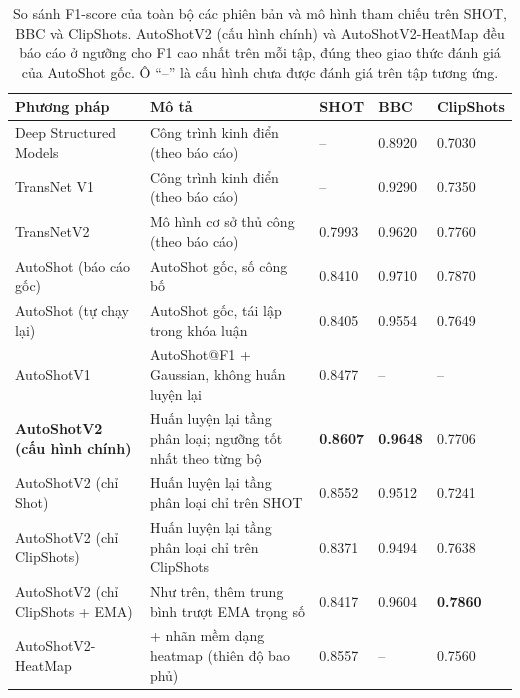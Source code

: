 \begin{table}[H]
\centering
\small
\setlength{\tabcolsep}{5pt}
\renewcommand{\arraystretch}{1.2}
\caption[So sánh F1-score các phiên bản trên SHOT, BBC và ClipShots]{So sánh F1-score của toàn bộ các phiên bản và mô hình tham chiếu trên SHOT, BBC và ClipShots. AutoShotV2 (cấu hình chính) và AutoShotV2-HeatMap đều báo cáo ở ngưỡng cho F1 cao nhất trên mỗi tập, đúng theo giao thức đánh giá của AutoShot gốc. Ô ``--'' là cấu hình chưa được đánh giá trên tập tương ứng.}
\label{tab:autoshotv2_results}
\begin{tabular}{L{4.4cm}L{4.0cm}C{1.35cm}C{1.35cm}C{1.5cm}}
\toprule
\textbf{Phương pháp} & \textbf{Mô tả} & \textbf{SHOT} & \textbf{BBC} & \textbf{ClipShots} \\
\midrule
Deep Structured Models & Công trình kinh điển (theo báo cáo) & -- & 0.8920 & 0.7030 \\
TransNet V1 & Công trình kinh điển (theo báo cáo) & -- & 0.9290 & 0.7350 \\
TransNetV2 & Mô hình cơ sở thủ công (theo báo cáo) & 0.7993 & 0.9620 & 0.7760 \\
AutoShot (báo cáo gốc) & AutoShot gốc, số công bố & 0.8410 & 0.9710 & 0.7870 \\
AutoShot (tự chạy lại) & AutoShot gốc, tái lập trong khóa luận & 0.8405 & 0.9554 & 0.7649 \\
\midrule
AutoShotV1 & AutoShot@F1 + Gaussian, không huấn luyện lại & 0.8477 & -- & -- \\
\textbf{AutoShotV2 (cấu hình chính)} & Huấn luyện lại tầng phân loại; ngưỡng tốt nhất theo từng bộ & \textbf{0.8607} & \textbf{0.9648} & 0.7706 \\
AutoShotV2 (chỉ Shot) & Huấn luyện lại tầng phân loại chỉ trên SHOT & 0.8552 & 0.9512 & 0.7241 \\
AutoShotV2 (chỉ ClipShots) & Huấn luyện lại tầng phân loại chỉ trên ClipShots & 0.8371 & 0.9494 & 0.7638 \\
AutoShotV2 (chỉ ClipShots + EMA) & Như trên, thêm trung bình trượt EMA trọng số & 0.8417 & 0.9604 & \textbf{0.7860} \\
AutoShotV2-HeatMap & + nhãn mềm dạng heatmap (thiên độ bao phủ) & 0.8557 & -- & 0.7560 \\
\bottomrule
\end{tabular}
\end{table}

